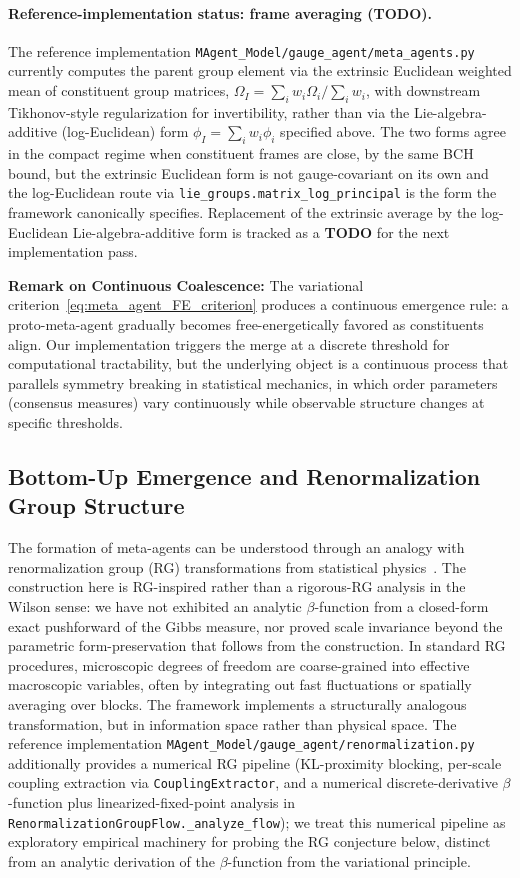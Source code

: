 \documentclass[11pt]{article}
\begin{document}
\paragraph{Reference-implementation status: frame averaging (\textbf{TODO}).}
The reference implementation \texttt{MAgent\_Model/gauge\_agent/meta\_agents.py} currently computes the parent group element via the extrinsic Euclidean weighted mean of constituent group matrices, $\Omega_I = \sum_i w_i \Omega_i / \sum_i w_i$, with downstream Tikhonov-style regularization for invertibility, rather than via the Lie-algebra-additive (log-Euclidean) form $\phi_I = \sum_i w_i \phi_i$ specified above. The two forms agree in the compact regime when constituent frames are close, by the same BCH bound, but the extrinsic Euclidean form is not gauge-covariant on its own and the log-Euclidean route via \texttt{lie\_groups.matrix\_log\_principal} is the form the framework canonically specifies. Replacement of the extrinsic average by the log-Euclidean Lie-algebra-additive form is tracked as a \textbf{TODO} for the next implementation pass.

\textbf{Remark on Continuous Coalescence:} The variational criterion~\eqref{eq:meta_agent_FE_criterion} produces a continuous emergence rule: a proto-meta-agent gradually becomes free-energetically favored as constituents align. Our implementation triggers the merge at a discrete threshold for computational tractability, but the underlying object is a continuous process that parallels symmetry breaking in statistical mechanics, in which order parameters (consensus measures) vary continuously while observable structure changes at specific thresholds.

\subsection{Bottom-Up Emergence and Renormalization Group Structure}

The formation of meta-agents can be understood through an analogy with renormalization group (RG) transformations from statistical physics~\cite{Wilson1971, Cardy1996}. The construction here is RG-inspired rather than a rigorous-RG analysis in the Wilson sense: we have not exhibited an analytic $\beta$-function from a closed-form exact pushforward of the Gibbs measure, nor proved scale invariance beyond the parametric form-preservation that follows from the construction. In standard RG procedures, microscopic degrees of freedom are coarse-grained into effective macroscopic variables, often by integrating out fast fluctuations or spatially averaging over blocks. The framework implements a structurally analogous transformation, but in information space rather than physical space. The reference implementation \texttt{MAgent\_Model/gauge\_agent/renormalization.py} additionally provides a numerical RG pipeline (KL-proximity blocking, per-scale coupling extraction via \texttt{CouplingExtractor}, and a numerical discrete-derivative $\beta$-function plus linearized-fixed-point analysis in \texttt{RenormalizationGroupFlow.\_analyze\_flow}); we treat this numerical pipeline as exploratory empirical machinery for probing the RG conjecture below, distinct from an analytic derivation of the $\beta$-function from the variational principle.
\end{document}
